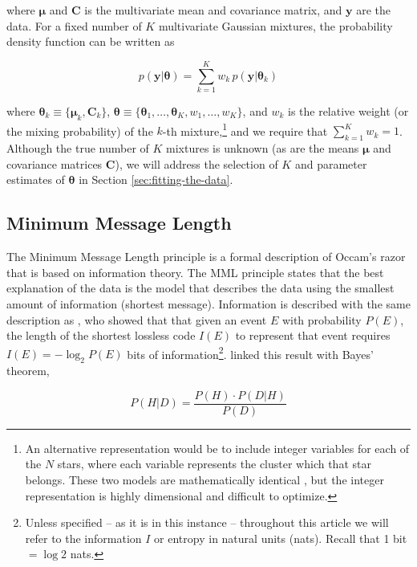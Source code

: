 \documentclass{aastex61}
\newcommand{\vect}[1]{\boldsymbol{\mathbf{#1}}}
\def\veccov{\vect{C}}
\def\vecmean{\vect{\mu}}
\def\vectheta{\vect{\theta}}
\def\weight{w}
\def\datum{y}
\def\data{\vect{\datum}}
\begin{document}
\noindent{}where $\vecmean$ and $\veccov$ is the multivariate mean and 
covariance matrix, and $\data$ are the data.
For a fixed number of $K$ multivariate Gaussian mixtures, the probability
density function can be written as

\begin{equation}
  p(\data|\vectheta) = \sum_{k=1}^{K} \weight_k \, p(\data|\vectheta_k)
\end{equation}

\noindent{}where $\vectheta_k \equiv \{\vecmean_k, \veccov_k\}$,
$\vectheta \equiv \{\vectheta_1,\dots,\vectheta_K,\weight_1,\dots,\weight_K\}$, and
$\weight_k$ is the relative weight (or the mixing probability) of the $k$-th 
mixture,\footnote{
  An alternative representation would be to include integer variables for each
  of the $N$ stars, where each variable represents the cluster which that star
  belongs.
  These two models are mathematically identical \citep{Foreman_Mackey_2014},
  but the integer representation is highly dimensional and difficult to
  optimize.}
and we require that $\sum_{k=1}^{K} \weight_k = 1$.
Although the true number of $K$ mixtures is unknown (as are the means $\vecmean$
and covariance matrices $\veccov$), we will address the selection of $K$
and parameter estimates of $\vectheta$ in Section \ref{sec:fitting-the-data}.


\subsection{Minimum Message Length}
\label{sec:mml}

The Minimum Message Length \citep[MML;][]{Wallace_1968} principle is a formal
description of Occam's razor that is based on information theory.
The MML principle states that the best explanation of the data is the model
that describes the data using the smallest amount of information (shortest
message).
Information is described with the same description as \citet{Shannon_1948},
who showed that that given an event $E$ with probability $P(E)$, the length of 
the shortest lossless code $I(E)$ to represent that event requires 
$I(E) = -\log_{2}P(E)$ bits of information\footnote{
  Unless specified -- as it is in this instance -- throughout this article we 
  will refer to the information $I$ or entropy in natural units (nats). 
  Recall that 1 bit $= \log{2}$ nats.
  }.
\citet{Wallace_1968} linked this result with Bayes' theorem, 

\begin{equation}
  P(H|D) = \frac{P(H)\cdot{}P(D|H)}{P(D)}
\end{equation}
\end{document}

